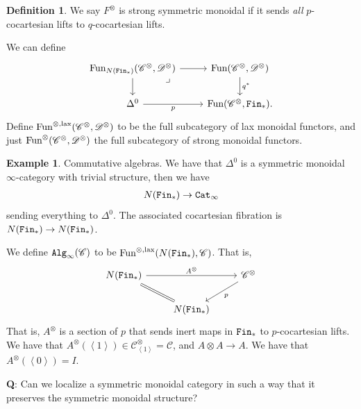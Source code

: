 \documentclass[12pt]{amsart}
\theoremstyle{definition}
\newtheorem{definition}[theorem]{Definition}
\newtheorem{example}[theorem]{Example}
\providecommand{\lax}{\text{lax}}
\begin{document}
\begin{definition} We say $F^{\otimes}$ is strong symmetric monoidal if it sends \textit{all} $p$-cocartesian lifts to $q$-cocartesian lifts.
\end{definition}

We can define
\[ \begin{tikzcd}
    \Fun_{N(\Fin_\ast)}(\mathscr{C}^{\otimes}, \mathscr{D}^{\otimes})\rar\dar\pb & \Fun(\mathscr{C}^{\otimes},\mathscr{D}^{\otimes})\dar["q^\ast" right] \\
    \Delta^0\rar["p" below] & \Fun(\mathscr{C}^{\otimes},\Fin_\ast).
\end{tikzcd} \]
Define $\text{Fun}^{\otimes, \text{lax}}(\mathscr{C}^{\otimes}, \mathscr{D}^{\otimes})$ to be the full subcategory of lax monoidal functors, and just $\text{Fun}^{\otimes}(\mathscr{C}^{\otimes}, \mathscr{D}^{\otimes})$ the full subcategory of strong monoidal functors.


\begin{example} Commutative algebras. We have that $\Delta^0$ is a symmetric monoidal $\infty$-category with trivial structure, then we have
\begin{align*}
    N(\texttt{Fin}_\ast) \to \texttt{Cat}_\infty
\end{align*}
sending everything to $\Delta^0$. The associated cocartesian fibration is $N(\texttt{Fin}_\ast) \to N(\texttt{Fin}_\ast)$.
\end{example}

We define $\texttt{Alg}_\infty (\mathscr{C})$ to be $\Fun^{\otimes,\lax}(N(\Fin_\ast),\mathscr{C})$. That is,
\[ \begin{tikzcd}
    N(\Fin_\ast)\ar[dr,equal]\ar[rr,"A^{\otimes}" above] &  & \mathscr{C}^{\otimes}\ar[dl,"p" below right]\\
     & N(\Fin_\ast) & 
\end{tikzcd} \]
That is, $A^\otimes$ is a section of $p$ that sends inert maps in $\texttt{Fin}_\ast$ to $p$-cocartesian lifts. We have that $A^\otimes(\left\langle 1 \right\rangle) \in \mathscr{C}^\otimes_{\left\langle 1 \right\rangle} = \mathscr{C}$, and $A \otimes A \to A$. We have that $A^\otimes(\left\langle 0 \right\rangle) = I$.

\textbf{Q}: Can we localize a symmetric monoidal category in such a way that it preserves the symmetric monoidal structure?
\end{document}
